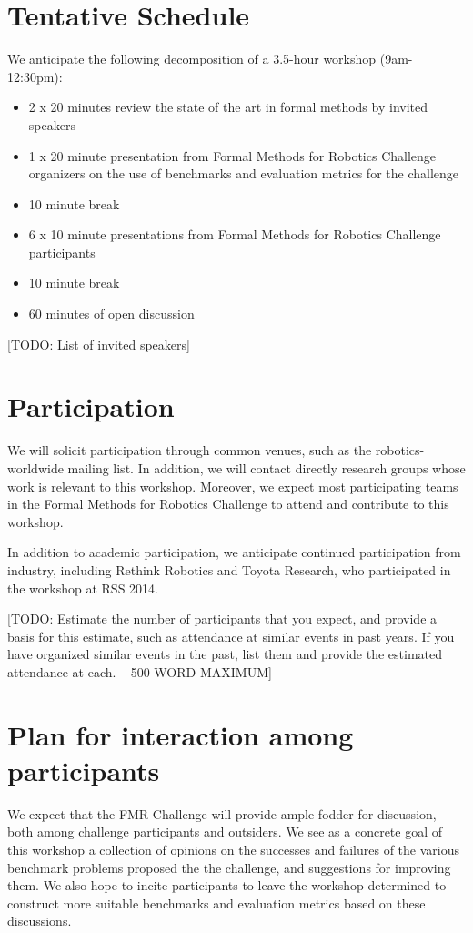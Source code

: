 \documentclass{amsart}
\theoremstyle{definition}
\begin{document}
\section{Tentative Schedule}
We anticipate the following decomposition of a 3.5-hour workshop (9am-12:30pm):
\begin{itemize}
\item 2 x 20 minutes review the state of the art in formal methods by invited speakers 
\item 1 x 20 minute presentation from Formal Methods for Robotics Challenge organizers on the use of benchmarks and evaluation metrics for the challenge 
\item 10 minute break
\item 6 x 10 minute presentations from Formal Methods for Robotics Challenge participants
\item 10 minute break
\item 60 minutes of open discussion
\end{itemize}


[TODO: List of invited speakers]


\section{Participation}
We will solicit participation through common venues, such as the robotics-worldwide mailing list. In addition, we will contact directly research groups whose work is relevant to this workshop. Moreover, we expect most participating teams in the Formal Methods for Robotics Challenge to attend and contribute to this workshop. 

In addition to academic participation, we anticipate continued participation from industry, including Rethink Robotics and Toyota Research, who participated in the workshop at RSS 2014. 

[TODO: Estimate the number of participants that you expect, and provide a 
basis for this estimate, such as attendance at similar events in past years. If you have organized similar 
events in the past, list them and provide the estimated attendance at each. -- 500 WORD MAXIMUM]

\section{Plan for interaction among participants}
We expect that the FMR Challenge will provide ample fodder for discussion, both among challenge participants and outsiders. We see as a concrete goal of this workshop a collection of opinions on the successes and failures of the various benchmark problems proposed the the challenge, and suggestions for improving them. We also hope to incite participants to leave the workshop determined to construct more suitable benchmarks and evaluation metrics based on these discussions.
\end{document}
